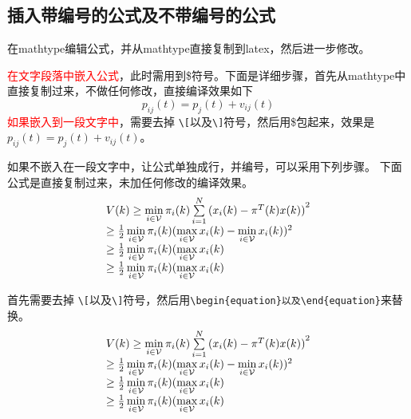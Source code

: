 \subsection{插入带编号的公式及不带编号的公式}
在mathtype编辑公式，并从mathtype直接复制到latex，然后进一步修改。

\textcolor{red}{在文字段落中嵌入公式}，此时需用到\$符号。下面是详细步骤，首先从mathtype中直接复制过来，不做任何修改，直接编译效果如下
\[{p_{ij}}(t) = {p_j}(t) + {v_{ij}}(t)\]
\textcolor{red}{如果嵌入到一段文字中}，需要去掉 \verb|\[|以及\verb|\]|符号，然后用\$包起来，效果是${p_{ij}}(t) = {p_j}(t) + {v_{ij}}(t)$。

如果不嵌入在一段文字中，让公式单独成行，并编号，可以采用下列步骤。
下面公式是直接复制过来，未加任何修改的编译效果。
\[\begin{array}{l}
V(k) \ge \mathop {\min }\limits_{i \in {\cal V}} {\pi _i}(k)\sum\limits_{i = 1}^N {{{({x_i}(k) - {\pi ^T}(k)x(k))}^2}} \\
 \ge \frac{1}{2}\mathop {\min }\limits_{i \in {\cal V}} {\pi _i}(k){(\mathop {\max }\limits_{i \in {\cal V}} {x_i}(k) - \mathop {\min }\limits_{i \in {\cal V}} {x_i}(k))^2}\\
 \ge \frac{1}{2}\mathop {\min }\limits_{i \in {\cal V}} {\pi _i}(k)(\mathop {\max }\limits_{i \in {\cal V}} {x_i}(k)\\
 \ge \frac{1}{2}\mathop {\min }\limits_{i \in {\cal V}} {\pi _i}(k)(\mathop {\max }\limits_{i \in {\cal V}} {x_i}(k)
\end{array}\]

首先需要去掉 \verb|\[|以及\verb|\]|符号，然后用\verb+\begin{equation}以及\end{equation}+来替换。
\begin{equation}\label{system1}
  \begin{array}{l}
V(k) \ge \mathop {\min }\limits_{i \in {\cal V}} {\pi _i}(k)\sum\limits_{i = 1}^N {{{({x_i}(k) - {\pi ^T}(k)x(k))}^2}} \\
 \ge \frac{1}{2}\mathop {\min }\limits_{i \in {\cal V}} {\pi _i}(k){(\mathop {\max }\limits_{i \in {\cal V}} {x_i}(k) - \mathop {\min }\limits_{i \in {\cal V}} {x_i}(k))^2}\\
 \ge \frac{1}{2}\mathop {\min }\limits_{i \in {\cal V}} {\pi _i}(k)(\mathop {\max }\limits_{i \in {\cal V}} {x_i}(k)\\
 \ge \frac{1}{2}\mathop {\min }\limits_{i \in {\cal V}} {\pi _i}(k)(\mathop {\max }\limits_{i \in {\cal V}} {x_i}(k)
\end{array}
\end{equation}


